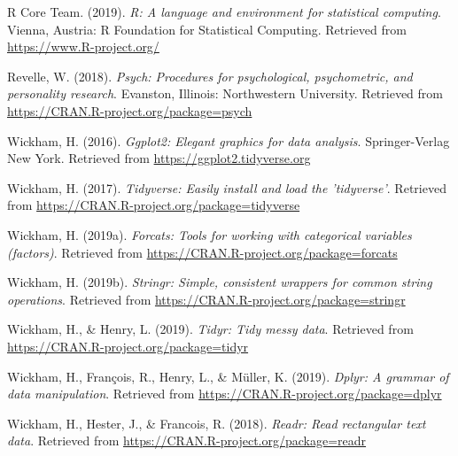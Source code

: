 \documentclass[man]{apa6}
\begin{document}
\hypertarget{ref-R-base}{}
R Core Team. (2019). \emph{R: A language and environment for statistical
computing}. Vienna, Austria: R Foundation for Statistical Computing.
Retrieved from \url{https://www.R-project.org/}

\hypertarget{ref-R-psych}{}
Revelle, W. (2018). \emph{Psych: Procedures for psychological,
psychometric, and personality research}. Evanston, Illinois:
Northwestern University. Retrieved from
\url{https://CRAN.R-project.org/package=psych}

\hypertarget{ref-R-ggplot2}{}
Wickham, H. (2016). \emph{Ggplot2: Elegant graphics for data analysis}.
Springer-Verlag New York. Retrieved from
\url{https://ggplot2.tidyverse.org}

\hypertarget{ref-R-tidyverse}{}
Wickham, H. (2017). \emph{Tidyverse: Easily install and load the
'tidyverse'}. Retrieved from
\url{https://CRAN.R-project.org/package=tidyverse}

\hypertarget{ref-R-forcats}{}
Wickham, H. (2019a). \emph{Forcats: Tools for working with categorical
variables (factors)}. Retrieved from
\url{https://CRAN.R-project.org/package=forcats}

\hypertarget{ref-R-stringr}{}
Wickham, H. (2019b). \emph{Stringr: Simple, consistent wrappers for
common string operations}. Retrieved from
\url{https://CRAN.R-project.org/package=stringr}

\hypertarget{ref-R-tidyr}{}
Wickham, H., \& Henry, L. (2019). \emph{Tidyr: Tidy messy data}.
Retrieved from \url{https://CRAN.R-project.org/package=tidyr}

\hypertarget{ref-R-dplyr}{}
Wickham, H., François, R., Henry, L., \& Müller, K. (2019). \emph{Dplyr:
A grammar of data manipulation}. Retrieved from
\url{https://CRAN.R-project.org/package=dplyr}

\hypertarget{ref-R-readr}{}
Wickham, H., Hester, J., \& Francois, R. (2018). \emph{Readr: Read
rectangular text data}. Retrieved from
\url{https://CRAN.R-project.org/package=readr}

\endgroup
\end{document}
